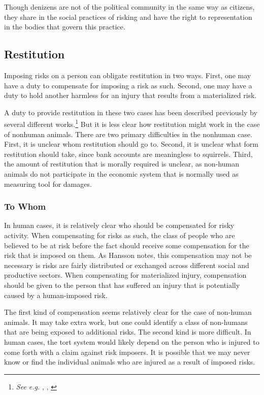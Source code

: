 Though denizens are not of the political community in the same way as citizens,
they share in the social practices of risking and have the right to
representation in the bodies that govern this practice.

\subsection{Restitution}

Imposing risks on a person can obligate restitution in two ways. First, one may
have a duty to compensate for imposing a risk as such. Second, one may have a
duty to hold another harmless for an injury that results from a materialized
risk.

A duty to provide restitution in these two cases has been described previously
by several different works.\footnote{\emph{See e.g.} \cite{hansson_risk},
\cite{frowe}, \cite{finkelstein}} But it is less clear how restitution might
work in the case of nonhuman animals. There are two primary difficulties in the
nonhuman case.  First, it is unclear whom restitution should go to. Second, it
is unclear what form restitution should take, since bank accounts are
meaningless to squirrels. Third, the amount of restitution that is morally
required is unclear, as non-human animals do not participate in the economic
system that is normally used as measuring tool for damages.

\subsubsection{To Whom}

In human cases, it is relatively clear who should be compensated for risky
activity. When compensating for risks as such, the class of people who are
believed to be at risk before the fact should receive some compensation for the
risk that is imposed on them. As Hansson notes, this compensation may not be
necessary is risks are fairly distributed or exchanged across different social
and productive sectors.\autocite[103]{hansson_risk} When compensating for
materialized injury, compensation should be given to the person that has
suffered an injury that is potentially caused by a human-imposed
risk.\autocite[112--113]{hansson_risk}


The first kind of compensation seems relatively clear for the case of non-human
animals. It may take extra work, but one could identify a class of non-humans
that are being exposed to additional risks. The second kind is more difficult.
In human cases, the tort system would likely depend on the person who is
injured to come forth with a claim against risk imposers. It is possible that
we may never know or find the individual animals who are injured as a result of
imposed risks.

